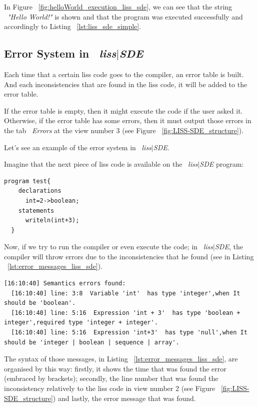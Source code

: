 \documentclass[
  oneside,
  11pt, a4paper,
  footinclude=true,
  headinclude=true,
  cleardoublepage=empty
]{scrbook}
\begin{document}
In Figure ~\ref{fig:helloWorld_execution_liss_sde}, we can see that the string ~\textit{"Hello World!"} is shown and that the program was executed successfully and accordingly to Listing ~\ref{lst:liss_sde_simple}.

\subsection{Error System in ~\textit{liss$|$SDE}}

Each time that a certain liss code goes to the compiler, an error table is built. And each inconsistencies that are found in the liss code, it will be added to the error table.

If the error table is empty, then it might execute the code if the user asked it. Otherwise, if the error table has some errors, then it must output those errors in the tab ~\textit{Errors} at the view number 3 (see Figure ~\ref{fig:LISS-SDE_structure}).

Let's see an example of the error system in ~\textit{liss$|$SDE}.

Imagine that the next piece of liss code is available on the ~\textit{liss$|$SDE} program:

\begin{lstlisting}[caption={Example of a liss code that isn't semantically correct},label={lst:error_semantic_liss_sde_example}]
  program test{
    declarations
      int=2->boolean;
    statements
      writeln(int+3);
  }
\end{lstlisting}

Now, if we try to run the compiler or even execute the code; in ~\textit{liss$|$SDE}, the compiler will throw errors due to the inconsistencies that he found (see in Listing ~\ref{lst:error_messages_liss_sde}).

\begin{lstlisting}[caption={Error messages in ~\textit{liss$|$SDE}},label={lst:error_messages_liss_sde}]
  [16:10:40] Semantics errors found:
  [16:10:40] line: 3:8  Variable 'int'  has type 'integer',when It should be 'boolean'.
  [16:10:40] line: 5:16  Expression 'int + 3'  has type 'boolean + integer',required type 'integer + integer'.
  [16:10:40] line: 5:16  Expression 'int+3'  has type 'null',when It should be 'integer | boolean | sequence | array'.
\end{lstlisting}
 
The syntax of those messages, in Listing ~\ref{lst:error_messages_liss_sde}, are organised by this way: firstly, it shows the time that was found the error (embraced by brackets); secondly, the line number that was found the inconsistency relatively to the liss code in view number 2 (see Figure ~\ref{fig:LISS-SDE_structure}) and lastly, the error message that was found.
\end{document}
